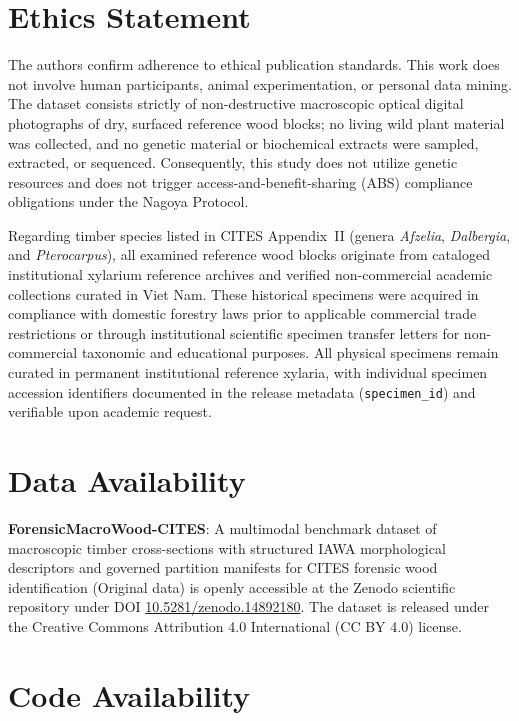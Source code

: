\documentclass[a4paper,fleqn,12pt]{cas-sc}
\begin{document}
\section{Ethics Statement}
\label{sec:ethics}

The authors confirm adherence to ethical publication standards. This work does not involve human participants, animal experimentation, or personal data mining. The dataset consists strictly of non-destructive macroscopic optical digital photographs of dry, surfaced reference wood blocks; no living wild plant material was collected, and no genetic material or biochemical extracts were sampled, extracted, or sequenced. Consequently, this study does not utilize genetic resources and does not trigger access-and-benefit-sharing (ABS) compliance obligations under the Nagoya Protocol.

Regarding timber species listed in CITES Appendix~II (genera \textit{Afzelia}, \textit{Dalbergia}, and \textit{Pterocarpus}), all examined reference wood blocks originate from cataloged institutional xylarium reference archives and verified non-commercial academic collections curated in Viet Nam. These historical specimens were acquired in compliance with domestic forestry laws prior to applicable commercial trade restrictions or through institutional scientific specimen transfer letters for non-commercial taxonomic and educational purposes. All physical specimens remain curated in permanent institutional reference xylaria, with individual specimen accession identifiers documented in the release metadata (\texttt{specimen\_id}) and verifiable upon academic request.

\section{Data Availability}
\label{sec:data_availability}

\textbf{ForensicMacroWood-CITES}: A multimodal benchmark dataset of macroscopic timber cross-sections with structured IAWA morphological descriptors and governed partition manifests for CITES forensic wood identification (Original data) is openly accessible at the Zenodo scientific repository under DOI \href{https://doi.org/10.5281/zenodo.14892180}{10.5281/zenodo.14892180}. The dataset is released under the Creative Commons Attribution 4.0 International (CC BY 4.0) license.

\section{Code Availability}
\label{sec:code_availability}
\end{document}
